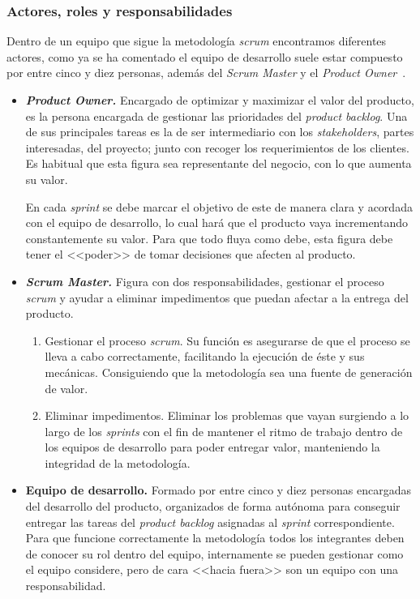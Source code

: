 \subsubsection{Actores, roles y responsabilidades}
Dentro de un equipo que sigue la metodología \textit{scrum} encontramos diferentes actores, como ya se ha comentado el equipo de desarrollo suele estar compuesto por entre cinco y diez personas, además del \textit{Scrum Master} y el \textit{Product Owner}~\cite{julioroche_2020}.
\begin{itemize}
\item \textbf{\textit{Product Owner.}} Encargado de optimizar y maximizar el valor del producto, es la persona encargada de gestionar las prioridades del \textit{product backlog}. Una de sus principales tareas es la de ser intermediario con los \textit{stakeholders}, partes interesadas, del proyecto; junto con recoger los requerimientos de los clientes. Es habitual que esta figura sea representante del negocio, con lo que aumenta su valor.

En cada \textit{sprint} se debe marcar el objetivo de este de manera clara y acordada con el equipo de desarrollo, lo cual hará que el producto vaya incrementando constantemente su valor. Para que todo fluya como debe, esta figura debe tener el <<poder>> de tomar decisiones que afecten al producto.

\item \textbf{\textit{Scrum Master.}} Figura con dos responsabilidades, gestionar el proceso \textit{scrum} y ayudar a eliminar impedimentos que puedan afectar a la entrega del producto.
\begin{enumerate}
\item Gestionar el proceso \textit{scrum}. Su función es asegurarse de que el proceso se lleva a cabo correctamente, facilitando la ejecución de éste y sus mecánicas. Consiguiendo que la metodología sea una fuente de generación de valor.
\item Eliminar impedimentos. Eliminar los problemas que vayan surgiendo a lo largo de los \textit{sprints} con el fin de mantener el ritmo de trabajo dentro de los equipos de desarrollo para poder entregar valor, manteniendo la integridad de la metodología.
\end{enumerate}
\item \textbf{Equipo de desarrollo.} Formado por entre cinco y diez personas encargadas del desarrollo del producto, organizados de forma autónoma para conseguir entregar las tareas del \textit{product backlog} asignadas al \textit{sprint} correspondiente. Para que funcione correctamente la metodología todos los integrantes deben de conocer su rol dentro del equipo, internamente se pueden gestionar como el equipo considere, pero de cara <<hacia fuera>> son un equipo con una responsabilidad.
\end{itemize}

